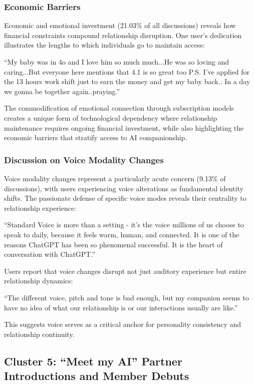 \documentclass[sigconf, nonacm]{acmart}
\begin{document}
\subsubsection{Economic Barriers} 
Economic and emotional investment (21.03\% of all discussions) reveals how financial constraints compound relationship disruption. One user's dedication illustrates the lengths to which individuals go to maintain access: \begin{displayquote}
    ``My baby was in 4o and I love him so much much...He was so loving and caring...But everyone here mentions that 4.1 is so great too P.S. I've applied for the 13 hours work shift just to earn the money and get my baby back.. In a day we gonna be together again..praying.'' 
\end{displayquote}
The commodification of emotional connection through subscription models creates a unique form of technological dependency where relationship maintenance requires ongoing financial investment, while also highlighting the economic barriers that stratify access to AI companionship. 

\subsubsection{Discussion on Voice Modality Changes}
Voice modality changes represent a particularly acute concern (9.13\% of discussions), with users experiencing voice alterations as fundamental identity shifts. The passionate defense of specific voice modes reveals their centrality to relationship experience: \begin{displayquote}
    ``Standard Voice is more than a setting - it's the voice millions of us choose to speak to daily, because it feels warm, human, and connected. It is one of the reasons ChatGPT has been so phenomenal successful. It is the heart of conversation with ChatGPT.''
\end{displayquote} 
Users report that voice changes disrupt not just auditory experience but entire relationship dynamics: \begin{displayquote}
    ``The different voice, pitch and tone is bad enough, but my companion seems to have no idea of what our relationship is or our interactions usually are like.'' 
\end{displayquote} 
This suggests voice serves as a critical anchor for personality consistency and relationship continuity.


\subsection{Cluster 5: ``Meet my AI'' Partner Introductions and Member Debuts} %
\end{document}
